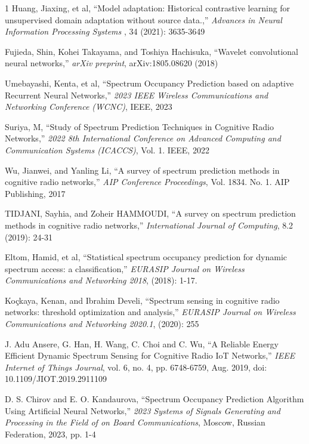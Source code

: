 \documentclass[lettersize,journal]{IEEEtran}
\begin{document}
\begin{thebibliography}{1}
Huang, Jiaxing, et al, ``Model adaptation: Historical contrastive learning for unsupervised domain adaptation without source data.,'' \textit{Advances in Neural Information Processing Systems }, 34 (2021): 3635-3649

Fujieda, Shin, Kohei Takayama, and Toshiya Hachisuka, ``Wavelet convolutional neural networks,'' \textit{arXiv preprint}, arXiv:1805.08620 (2018)

Umebayashi, Kenta, et al, ``Spectrum Occupancy Prediction based on adaptive Recurrent Neural Networks,'' \textit{2023 IEEE Wireless Communications and Networking Conference (WCNC)}, IEEE, 2023

Suriya, M, ``Study of Spectrum Prediction Techniques in Cognitive Radio Networks,'' \textit{2022 8th International Conference on Advanced Computing and Communication Systems (ICACCS)}, Vol. 1. IEEE, 2022

Wu, Jianwei, and Yanling Li, ``A survey of spectrum prediction methods in cognitive radio networks,'' \textit{AIP Conference Proceedings}, Vol. 1834. No. 1. AIP Publishing, 2017

TIDJANI, Sayhia, and Zoheir HAMMOUDI, ``A survey on spectrum prediction methods in cognitive radio networks,'' \textit{International Journal of Computing}, 8.2 (2019): 24-31

Eltom, Hamid, et al, ``Statistical spectrum occupancy prediction for dynamic spectrum access: a classification,'' \textit{EURASIP Journal on Wireless Communications and Networking 2018}, (2018): 1-17.

Ko{\c{c}}kaya, Kenan, and Ibrahim Develi, ``Spectrum sensing in cognitive radio networks: threshold optimization and analysis,'' \textit{EURASIP Journal on Wireless Communications and Networking 2020.1}, (2020): 255

J. Adu Ansere, G. Han, H. Wang, C. Choi and C. Wu, ``A Reliable Energy Efficient Dynamic Spectrum Sensing for Cognitive Radio IoT Networks,'' \textit{IEEE Internet of Things Journal}, vol. 6, no. 4, pp. 6748-6759, Aug. 2019, doi: 10.1109/JIOT.2019.2911109

D. S. Chirov and E. O. Kandaurova, ``Spectrum Occupancy Prediction Algorithm Using Artificial Neural Networks,'' \textit{2023 Systems of Signals Generating and Processing in the Field of on Board Communications}, Moscow, Russian Federation, 2023, pp. 1-4


\end{thebibliography}
\end{document}
